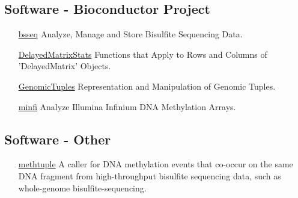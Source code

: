 \documentclass[11pt,letterpaper,pdf]{article}
\begin{document}
\subsection*{Software - Bioconductor Project}


\begin{enumerate}[labelindent=1cm,align=left]
  \item[\href{http://www.bioconductor.org/packages/bsseq}{bsseq}]
    Analyze, Manage and Store Bisulfite Sequencing Data.
  \item[\href{http://www.bioconductor.org/packages/DelayedMatrixStats}{DelayedMatrixStats}]
    Functions that Apply to Rows and Columns of 'DelayedMatrix' Objects.
  \item[\href{http://www.bioconductor.org/packages/GenomicTuples}{GenomicTuples}]
    Representation and Manipulation of Genomic Tuples.
  \item[\href{http://www.bioconductor.org/packages/minfi}{minfi}]
    Analyze Illumina Infinium DNA Methylation Arrays.
\end{enumerate}

\subsection*{Software - Other}


\begin{enumerate}[labelindent=1cm,align=left]
  \item[\href{https://pypi.python.org/pypi/methtuple/}{methtuple}] A caller for DNA methylation events that co-occur on the same DNA fragment from high-throughput bisulfite sequencing data, such as whole-genome bisulfite-sequencing.
\end{enumerate}
\end{document}

